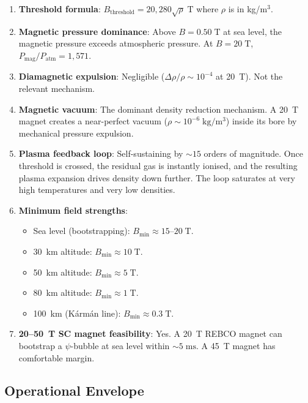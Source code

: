 \documentclass[11pt,a4paper]{article}
\begin{document}
\begin{enumerate}
\item \textbf{Threshold formula}: $B_{\mathrm{threshold}} = 20{,}280\sqrt{\rho}\;\mathrm{T}$
where $\rho$ is in kg/m$^3$.

\item \textbf{Magnetic pressure dominance}: Above $B = 0.50\;\mathrm{T}$ at sea level,
the magnetic pressure exceeds atmospheric pressure. At $B = 20\;\mathrm{T}$,
$P_{\mathrm{mag}}/P_{\mathrm{atm}} = 1{,}571$.

\item \textbf{Diamagnetic expulsion}: Negligible ($\Delta\rho/\rho \sim 10^{-4}$
at 20~T). Not the relevant mechanism.

\item \textbf{Magnetic vacuum}: The dominant density reduction mechanism. A 20~T
magnet creates a near-perfect vacuum ($\rho \sim 10^{-6}\;\mathrm{kg/m^3}$) inside
its bore by mechanical pressure expulsion.

\item \textbf{Plasma feedback loop}: Self-sustaining by $\sim 15$ orders of magnitude.
Once threshold is crossed, the residual gas is instantly ionised, and the resulting
plasma expansion drives density down further. The loop saturates at very high
temperatures and very low densities.

\item \textbf{Minimum field strengths}:
  \begin{itemize}
  \item Sea level (bootstrapping): $B_{\mathrm{min}} \approx 15$--$20\;\mathrm{T}$.
  \item 30~km altitude: $B_{\mathrm{min}} \approx 10\;\mathrm{T}$.
  \item 50~km altitude: $B_{\mathrm{min}} \approx 5\;\mathrm{T}$.
  \item 80~km altitude: $B_{\mathrm{min}} \approx 1\;\mathrm{T}$.
  \item 100~km (K\'arm\'an line): $B_{\mathrm{min}} \approx 0.3\;\mathrm{T}$.
  \end{itemize}

\item \textbf{20--50~T SC magnet feasibility}: Yes. A 20~T REBCO magnet can bootstrap
a $\psi$-bubble at sea level within $\sim 5\;\mathrm{ms}$. A 45~T magnet has
comfortable margin.
\end{enumerate}

\subsection{Operational Envelope}
\end{document}
